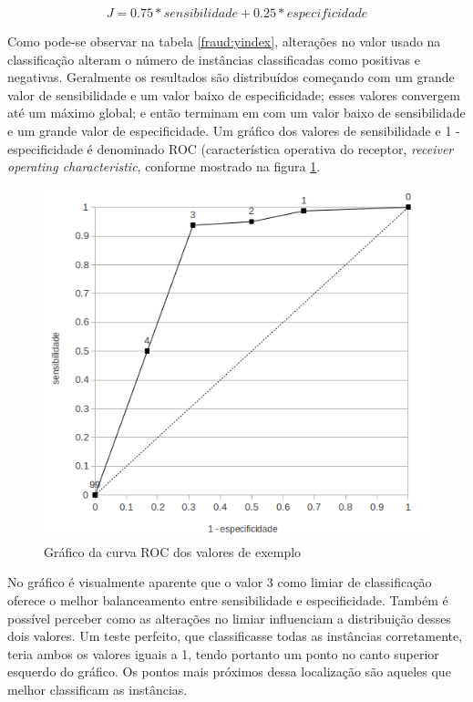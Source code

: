 \vspace{2mm}
\begin{equation}
    J = 0.75 * sensibilidade + 0.25 * especificidade
\end{equation}
\vspace{2mm}

Como pode-se observar na tabela \ref{fraud:yindex}, alterações no valor usado na classificação alteram o número de instâncias classificadas como positivas e negativas. Geralmente os resultados são distribuídos começando com um grande valor de sensibilidade e um valor baixo de especificidade; esses valores convergem até um máximo global; e então terminam em com um valor baixo de sensibilidade e um grande valor de especificidade. Um gráfico dos valores de sensibilidade e 1 - especificidade é denominado ROC (característica operativa do receptor, \emph{receiver operating characteristic}, conforme mostrado na figura \ref{fraud:roc}.

\begin{figure}[h!]
\centering
\includegraphics[scale=0.5]{img/roc.png}
\caption{Gráfico da curva ROC dos valores de exemplo}
\label{fraud:roc}
\end{figure}

No gráfico é visualmente aparente que o valor 3 como limiar de classificação oferece o melhor balanceamento entre sensibilidade e especificidade. Também é possível perceber como as alterações no limiar influenciam a distribuição desses dois valores. Um teste perfeito, que classificasse todas as instâncias corretamente, teria ambos os valores iguais a 1, tendo portanto um ponto no canto superior esquerdo do gráfico. Os pontos mais próximos dessa localização são aqueles que melhor classificam as instâncias.

